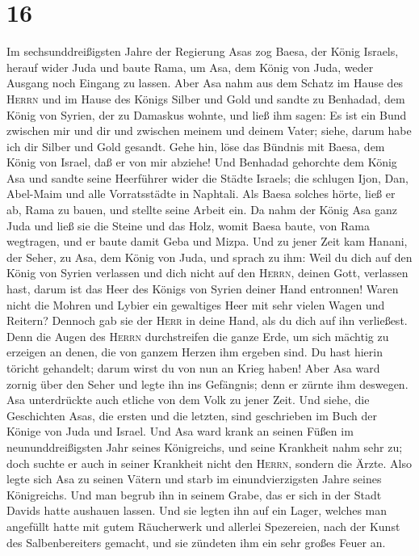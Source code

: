 \hypertarget{section-15}{%
\section{16}\label{section-15}}

 Im sechsunddreißigsten Jahre der Regierung Asas zog
Baesa, der König Israels, herauf wider Juda und baute Rama, um Asa, dem
König von Juda, weder Ausgang noch Eingang zu lassen. 
Aber Asa nahm aus dem Schatz im Hause des \textsc{Herrn} und im Hause
des Königs Silber und Gold und sandte zu Benhadad, dem König von Syrien,
der zu Damaskus wohnte, und ließ ihm sagen:  Es ist ein
Bund zwischen mir und dir und zwischen meinem und deinem Vater; siehe,
darum habe ich dir Silber und Gold gesandt. Gehe hin, löse das Bündnis
mit Baesa, dem König von Israel, daß er von mir abziehe! 
Und Benhadad gehorchte dem König Asa und sandte seine Heerführer wider
die Städte Israels; die schlugen Ijon, Dan, Abel-Maim und alle
Vorratsstädte in Naphtali.  Als Baesa solches hörte, ließ
er ab, Rama zu bauen, und stellte seine Arbeit ein.  Da
nahm der König Asa ganz Juda und ließ sie die Steine und das Holz, womit
Baesa baute, von Rama wegtragen, und er baute damit Geba und Mizpa.
 Und zu jener Zeit kam Hanani, der Seher, zu Asa, dem
König von Juda, und sprach zu ihm: Weil du dich auf den König von Syrien
verlassen und dich nicht auf den \textsc{Herrn}, deinen Gott, verlassen
hast, darum ist das Heer des Königs von Syrien deiner Hand entronnen!
 Waren nicht die Mohren und Lybier ein gewaltiges Heer mit
sehr vielen Wagen und Reitern? Dennoch gab sie der \textsc{Herr} in
deine Hand, als du dich auf ihn verließest.  Denn die
Augen des \textsc{Herrn} durchstreifen die ganze Erde, um sich mächtig
zu erzeigen an denen, die von ganzem Herzen ihm ergeben sind. Du hast
hierin töricht gehandelt; darum wirst du von nun an Krieg haben!
 Aber Asa ward zornig über den Seher und legte ihn ins
Gefängnis; denn er zürnte ihm deswegen. Asa unterdrückte auch etliche
von dem Volk zu jener Zeit.  Und siehe, die Geschichten
Asas, die ersten und die letzten, sind geschrieben im Buch der Könige
von Juda und Israel.  Und Asa ward krank an seinen Füßen
im neununddreißigsten Jahr seines Königreichs, und seine Krankheit nahm
sehr zu; doch suchte er auch in seiner Krankheit nicht den
\textsc{Herrn}, sondern die Ärzte.  Also legte sich Asa
zu seinen Vätern und starb im einundvierzigsten Jahre seines
Königreichs.  Und man begrub ihn in seinem Grabe, das er
sich in der Stadt Davids hatte aushauen lassen. Und sie legten ihn auf
ein Lager, welches man angefüllt hatte mit gutem Räucherwerk und
allerlei Spezereien, nach der Kunst des Salbenbereiters gemacht, und sie
zündeten ihm ein sehr großes Feuer an.

